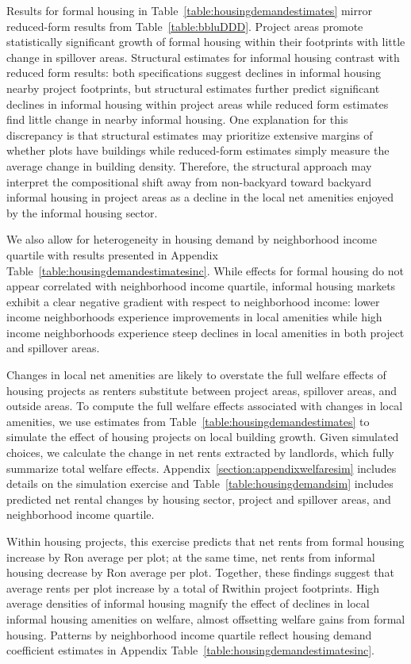 \documentclass[12pt]{article}
\begin{document}
Results for formal housing in Table~\ref{table:housingdemandestimates} mirror reduced-form results from Table~\ref{table:bbluDDD}.  Project areas promote statistically significant growth of formal housing within their footprints with little change in spillover areas.  Structural estimates for informal housing contrast with reduced form results: both specifications suggest declines in informal housing nearby project footprints, but structural estimates further predict significant declines in informal housing within project areas while reduced form estimates find little change in nearby informal housing.  One explanation for this discrepancy is that structural estimates may prioritize extensive margins of whether plots have buildings while reduced-form estimates simply measure the average change in building density.  Therefore, the structural approach may interpret the compositional shift away from non-backyard toward backyard informal housing in project areas as a decline in the local net amenities enjoyed by the informal housing sector.

We also allow for heterogeneity in housing demand by neighborhood income quartile with results presented in Appendix Table~\ref{table:housingdemandestimatesinc}.  While effects for formal housing do not appear correlated with neighborhood income quartile, informal housing markets exhibit a clear negative gradient with respect to neighborhood income: lower income neighborhoods experience improvements in local amenities while high income neighborhoods experience steep declines in local amenities in both project and spillover areas.

Changes in local net amenities are likely to overstate the full welfare effects of housing projects as renters substitute between project areas, spillover areas, and outside areas.  To compute the full welfare effects associated with changes in local amenities, we use estimates from Table~\ref{table:housingdemandestimates} to simulate the effect of housing projects on local building growth.  Given simulated choices, we calculate the change in net rents extracted by landlords, which fully summarize total welfare effects.  Appendix~\ref{section:appendixwelfaresim} includes details on the simulation exercise and Table~\ref{table:housingdemandsim} includes predicted net rental changes by housing sector, project and spillover areas, and neighborhood income quartile.

Within housing projects, this exercise predicts that net rents from formal housing increase by Ron average per plot; at the same time, net rents from informal housing decrease by Ron average per plot.  Together, these findings suggest that average rents per plot increase by a total of Rwithin project footprints. High average densities of informal housing magnify the effect of declines in local informal housing amenities on welfare, almost offsetting welfare gains from formal housing.  Patterns by neighborhood income quartile reflect housing demand coefficient estimates in Appendix Table~\ref{table:housingdemandestimatesinc}.
\end{document}
